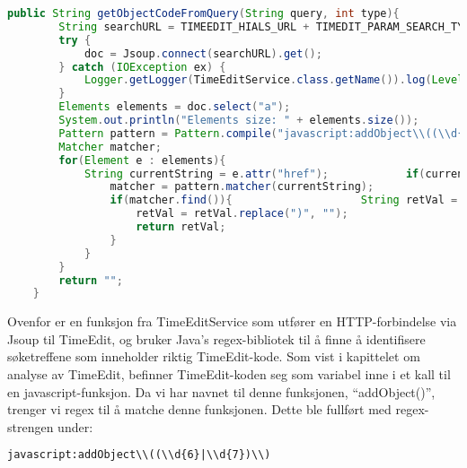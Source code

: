 \documentclass[../main.tex]{subfiles}
\begin{document}
\begin{lstlisting}[language=Java, frame=single, caption={Nytte-funksjon i klassen TimeEditService som bruker regulære uttrykk for å hente ut objektkoder}]
public String getObjectCodeFromQuery(String query, int type){
        String searchURL = TIMEEDIT_HIALS_URL + TIMEDIT_PARAM_SEARCH_TYPE + "=" + type + "&" + TIMEDIT_PARAM_SEARCH + "=" + query;        Document doc = null;
        try {
            doc = Jsoup.connect(searchURL).get();
        } catch (IOException ex) {
            Logger.getLogger(TimeEditService.class.getName()).log(Level.SEVERE, null, ex);
        }
        Elements elements = doc.select("a");
        System.out.println("Elements size: " + elements.size());
        Pattern pattern = Pattern.compile("javascript:addObject\\((\\d{6}|\\d{7})\\)");
        Matcher matcher;
        for(Element e : elements){
            String currentString = e.attr("href");            if(currentString != null && !currentString.isEmpty()){
                matcher = pattern.matcher(currentString);
                if(matcher.find()){                    String retVal = matcher.group().replace("javascript:addObject(", "");
                    retVal = retVal.replace(")", "");
                    return retVal;
                }
            }
        }
        return "";
    }
\end{lstlisting}

Ovenfor er en funksjon fra TimeEditService som utfører en HTTP-forbindelse via Jsoup til TimeEdit, og bruker Java’s regex-bibliotek til å finne å identifisere søketreffene som inneholder riktig TimeEdit-kode. Som vist i kapittelet om analyse av TimeEdit, befinner TimeEdit-koden seg som variabel inne i et kall til en javascript-funksjon. Da vi har navnet til denne funksjonen, “addObject()”, trenger vi regex til å matche denne funksjonen. Dette ble fullført med regex-strengen under:

\begin{lstlisting}[language=HTML, frame=single, caption={Utdrag fra kildekoden i figur \ref{fig:timeeditc}}]
javascript:addObject\\((\\d{6}|\\d{7})\\)
\end{lstlisting}
\end{document}
